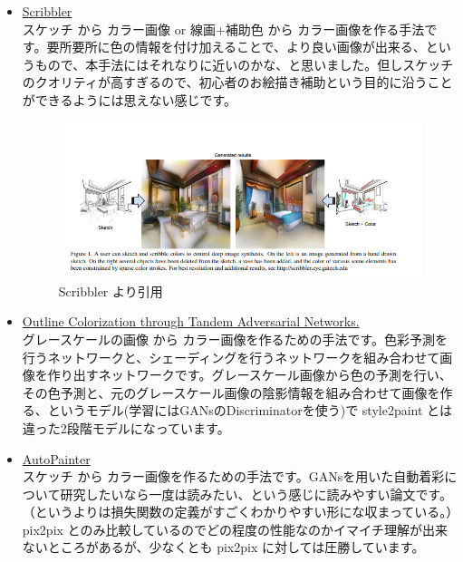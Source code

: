 \documentclass[a4paper, dvipdfmx, 10pt]{article}
\begin{document}
\begin{itemize}
\item \href{https://arxiv.org/abs/1612.00835}{Scribbler}\\

スケッチ から カラー画像 or 線画+補助色 から カラー画像を作る手法です。要所要所に色の情報を付け加えることで、より良い画像が出来る、というもので、本手法にはそれなりに近いのかな、と思いました。但しスケッチのクオリティが高すぎるので、初心者のお絵描き補助という目的に沿うことができるようには思えない感じです。\\
\begin{figure}[htbp]
\centering
\includegraphics[width=.9\linewidth]{./img/scribbler_abst.png}
\caption{Scribbler より引用}
\end{figure}

\item \href{https://arxiv.org/pdf/1704.08834.pdf}{Outline Colorization through Tandem Adversarial Networks.}\\

グレースケールの画像 から カラー画像を作るための手法です。色彩予測を行うネットワークと、シェーディングを行うネットワークを組み合わせて画像を作り出すネットワークです。グレースケール画像から色の予測を行い、その色予測と、元のグレースケール画像の陰影情報を組み合わせて画像を作る、というモデル(学習にはGANsのDiscriminatorを使う)で style2paint とは違った2段階モデルになっています。\\

\item \href{https://arxiv.org/pdf/1705.01908.pdf}{AutoPainter}\\

スケッチ から カラー画像を作るための手法です。GANsを用いた自動着彩について研究したいなら一度は読みたい、という感じに読みやすい論文です。（というよりは損失関数の定義がすごくわかりやすい形にな収まっている。）pix2pix とのみ比較しているのでどの程度の性能なのかイマイチ理解が出来ないところがあるが、少なくとも pix2pix に対しては圧勝しています。\\


\end{itemize}
\end{document}
